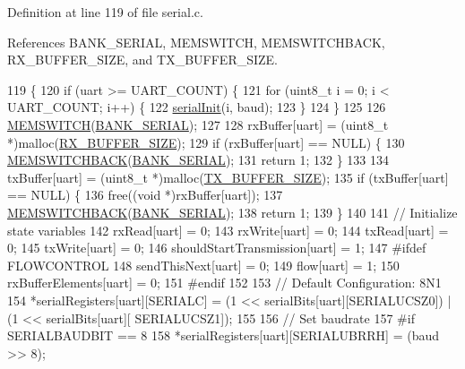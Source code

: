 Definition at line 119 of file serial.\-c.



References B\-A\-N\-K\-\_\-\-S\-E\-R\-I\-A\-L, M\-E\-M\-S\-W\-I\-T\-C\-H, M\-E\-M\-S\-W\-I\-T\-C\-H\-B\-A\-C\-K, R\-X\-\_\-\-B\-U\-F\-F\-E\-R\-\_\-\-S\-I\-Z\-E, and T\-X\-\_\-\-B\-U\-F\-F\-E\-R\-\_\-\-S\-I\-Z\-E.


\begin{DoxyCode}
119                                                 \{
120     \textcolor{keywordflow}{if} (uart >= UART\_COUNT) \{
121         \textcolor{keywordflow}{for} (uint8\_t i = 0; i < UART\_COUNT; i++) \{
122             \hyperlink{group__uart_ga8d59ee8831dd38c77b52deb7af9410e3}{serialInit}(i, baud);
123         \}
124     \}
125 
126     \hyperlink{group__xmem_ga253830e5022f2aa99177acd8a0ba0bfe}{MEMSWITCH}(\hyperlink{group__xmem_gaa5177871b2303418ed492a18405273f9}{BANK\_SERIAL});
127 
128     rxBuffer[uart] = (uint8\_t *)malloc(\hyperlink{group__uart_ga739a2a1a0047c98ac1b18ecd25dac092}{RX\_BUFFER\_SIZE});
129     \textcolor{keywordflow}{if} (rxBuffer[uart] == NULL) \{
130         \hyperlink{group__xmem_ga96199c8c5e6fbc65dd60aa67de63fd34}{MEMSWITCHBACK}(\hyperlink{group__xmem_gaa5177871b2303418ed492a18405273f9}{BANK\_SERIAL});
131         \textcolor{keywordflow}{return} 1;
132     \}
133 
134     txBuffer[uart] = (uint8\_t *)malloc(\hyperlink{group__uart_ga9ab33647617098646990fe263600b650}{TX\_BUFFER\_SIZE});
135     \textcolor{keywordflow}{if} (txBuffer[uart] == NULL) \{
136         free((\textcolor{keywordtype}{void} *)rxBuffer[uart]);
137         \hyperlink{group__xmem_ga96199c8c5e6fbc65dd60aa67de63fd34}{MEMSWITCHBACK}(\hyperlink{group__xmem_gaa5177871b2303418ed492a18405273f9}{BANK\_SERIAL});
138         \textcolor{keywordflow}{return} 1;
139     \}
140 
141     \textcolor{comment}{// Initialize state variables}
142     rxRead[uart] = 0;
143     rxWrite[uart] = 0;
144     txRead[uart] = 0;
145     txWrite[uart] = 0;
146     shouldStartTransmission[uart] = 1;
147 \textcolor{preprocessor}{#ifdef FLOWCONTROL}
148 \textcolor{preprocessor}{}    sendThisNext[uart] = 0;
149     flow[uart] = 1;
150     rxBufferElements[uart] = 0;
151 \textcolor{preprocessor}{#endif}
152 \textcolor{preprocessor}{}
153     \textcolor{comment}{// Default Configuration: 8N1}
154     *serialRegisters[uart][SERIALC] = (1 << serialBits[uart][SERIALUCSZ0]) | (1 << serialBits[uart][
      SERIALUCSZ1]);
155 
156     \textcolor{comment}{// Set baudrate}
157 \textcolor{preprocessor}{#if SERIALBAUDBIT == 8}
158 \textcolor{preprocessor}{}    *serialRegisters[uart][SERIALUBRRH] = (baud >> 8);

\end{DoxyCode}
